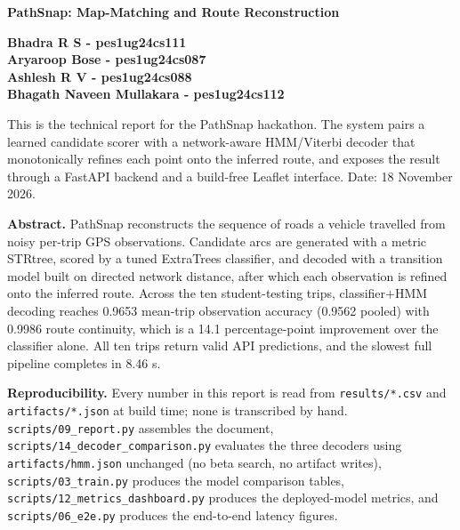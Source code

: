 \documentclass[11pt,a4paper]{article}
\newcommand{\code}[1]{\texttt{\small #1}}
\begin{document}
\begin{center}
{\LARGE\bfseries PathSnap: Map-Matching and Route Reconstruction}\\[4pt]
\end{center}
\begin{center}
\textbf{Bhadra R S - pes1ug24cs111}\\[2pt]
\textbf{Aryaroop Bose - pes1ug24cs087}\\[2pt]
\textbf{Ashlesh R V - pes1ug24cs088}\\[2pt]
\textbf{Bhagath Naveen Mullakara - pes1ug24cs112}\\[2pt]
\end{center}
\vspace{0.4em}

This is the technical report for the PathSnap hackathon. The system pairs a learned candidate scorer with a network-aware HMM/Viterbi decoder that monotonically refines each point onto the inferred route, and exposes the result through a FastAPI backend and a build-free Leaflet interface. Date: 18 November 2026.

\textbf{Abstract.} PathSnap reconstructs the sequence of roads a vehicle travelled from noisy per-trip GPS observations. Candidate arcs are generated with a metric STRtree, scored by a tuned ExtraTrees classifier, and decoded with a transition model built on directed network distance, after which each observation is refined onto the inferred route. Across the ten student-testing trips, classifier+HMM decoding reaches 0.9653 mean-trip observation accuracy (0.9562 pooled) with 0.9986 route continuity, which is a 14.1 percentage-point improvement over the classifier alone. All ten trips return valid API predictions, and the slowest full pipeline completes in 8.46 s.

\textbf{Reproducibility.} Every number in this report is read from \code{results/\allowbreak{}*.\allowbreak{}csv} and \code{artifacts/\allowbreak{}*.\allowbreak{}json} at build time; none is transcribed by hand. \code{scripts/\allowbreak{}09\_\allowbreak{}report.\allowbreak{}py} assembles the document, \code{scripts/\allowbreak{}14\_\allowbreak{}decoder\_\allowbreak{}comparison.\allowbreak{}py} evaluates the three decoders using \code{artifacts/\allowbreak{}hmm.\allowbreak{}json} unchanged (no beta search, no artifact writes), \code{scripts/\allowbreak{}03\_\allowbreak{}train.\allowbreak{}py} produces the model comparison tables, \code{scripts/\allowbreak{}12\_\allowbreak{}metrics\_\allowbreak{}dashboard.\allowbreak{}py} produces the deployed-model metrics, and \code{scripts/\allowbreak{}06\_\allowbreak{}e2e.\allowbreak{}py} produces the end-to-end latency figures.
\end{document}
